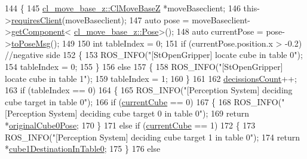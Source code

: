 \begin{DoxyCode}
144     \{
145         \hyperlink{classcl__move__base__z_1_1ClMoveBaseZ}{cl\_move\_base\_z::ClMoveBaseZ} *moveBaseclient;
146         this->\hyperlink{classsmacc_1_1ISmaccClient_a7a9990a2f3e35d547671188d69fee520}{requiresClient}(moveBaseclient);
147         \textcolor{keyword}{auto} pose = moveBaseclient->\hyperlink{classsmacc_1_1ISmaccClient_adef78db601749ca63c19e74a27cb88cc}{getComponent}<
      \hyperlink{classcl__move__base__z_1_1Pose}{cl\_move\_base\_z::Pose}>();
148         \textcolor{keyword}{auto} currentPose = pose->\hyperlink{classcl__move__base__z_1_1Pose_a9faf8c6b437ff6b19c8bddd692908dca}{toPoseMsg}();
149 
150         \textcolor{keywordtype}{int} tableIndex = 0;
151         \textcolor{keywordflow}{if} (currentPose.position.x > -0.2) \textcolor{comment}{//negative side}
152         \{
153             ROS\_INFO(\textcolor{stringliteral}{"[StOpenGripper] locate cube in table 0"});
154             tableIndex = 0;
155         \}
156         \textcolor{keywordflow}{else}
157         \{
158             ROS\_INFO(\textcolor{stringliteral}{"[StOpenGripper] locate cube in table 1"});
159             tableIndex = 1;
160         \}
161 
162         \hyperlink{classsm__moveit_1_1cl__perception__system_1_1ClPerceptionSystem_ab8272ccb5af7401beeb4e9eaf1d86fa3}{decissionsCount}++;
163         \textcolor{keywordflow}{if} (tableIndex == 0)
164         \{
165             ROS\_INFO(\textcolor{stringliteral}{"[Perception System] deciding cube target in table 0"});
166             \textcolor{keywordflow}{if} (\hyperlink{classsm__moveit_1_1cl__perception__system_1_1ClPerceptionSystem_a0ffeadfa41480c9d4d0fcc509237dff6}{currentCube} == 0)
167             \{
168                 ROS\_INFO(\textcolor{stringliteral}{"[Perception System] deciding cube target 0 in table 0"});
169                 \textcolor{keywordflow}{return} *\hyperlink{classsm__moveit_1_1cl__perception__system_1_1ClPerceptionSystem_a763b8723ae96eb30fd21e039e3f52c47}{originalCube0Pose};
170             \}
171             \textcolor{keywordflow}{else} \textcolor{keywordflow}{if} (\hyperlink{classsm__moveit_1_1cl__perception__system_1_1ClPerceptionSystem_a0ffeadfa41480c9d4d0fcc509237dff6}{currentCube} == 1)
172             \{
173                 ROS\_INFO(\textcolor{stringliteral}{"[Perception System] deciding cube target 1 in table 0"});
174                 \textcolor{keywordflow}{return} *\hyperlink{classsm__moveit_1_1cl__perception__system_1_1ClPerceptionSystem_a13cf34b1fb711829c4ddb9a9e2899ae9}{cube1DestinationInTable0};
175             \}
176             \textcolor{keywordflow}{else}

\end{DoxyCode}
